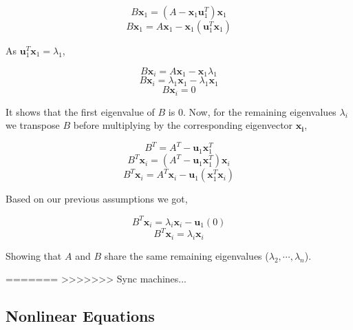 \documentclass{article}
\renewcommand{\vec}[1]{\mathbf{#1}}
\begin{document}
\begin{enumerate}
\begin{enumerate}
$$B\vec{x}_1=(A-\vec{x}_1\vec{u}_1^T)\vec{x}_1$$
$$B\vec{x}_1=A\vec{x}_1-\vec{x}_1(\vec{u}_1^T\vec{x}_1)$$

As $\vec{u}_1^T\vec{x}_1 = \lambda_1$,

$$B\vec{x}_i=A\vec{x}_1-\vec{x}_1\lambda_1$$
$$B\vec{x}_i=\lambda_1\vec{x}_1-\lambda_1\vec{x}_1$$
$$B\vec{x}_i=0$$

It shows that the first eigenvalue of $B$ is $0$.  Now, for the remaining eigenvalues $\lambda_i$ we transpose $B$ before multiplying by the corresponding eigenvector $\vec{x_i}$,

$$B^T=A^T-\vec{u}_1\vec{x}_1^T$$
$$B^T\vec{x}_i=(A^T-\vec{u}_1\vec{x}_1^T)\vec{x}_i$$
$$B^T\vec{x}_i=A^T\vec{x}_i-\vec{u}_1(\vec{x}_1^T\vec{x}_i)$$

Based on our previous assumptions we got,

$$B^T\vec{x}_i=\lambda_i\vec{x}_i-\vec{u}_1(0)$$
$$B^T\vec{x}_i=\lambda_i\vec{x}_i$$

Showing that $A$ and $B$ share the same remaining eigenvalues ($\lambda_2, \cdots, \lambda_n$). 

=======
>>>>>>> Sync machines...
\end{enumerate}

\end{enumerate}

\subsection*{Nonlinear Equations}
\end{document}
